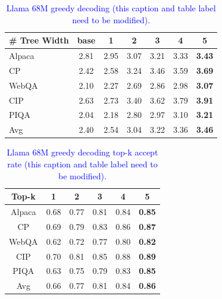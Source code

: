 \begin{table}
\begin{center}
\caption{\textcolor{blue}{Llama 68M greedy decoding (this caption and table label need to be modified).}}
\footnotesize
\label{tab:cbt-llama}
\begin{tabular}{l|cccccc}
\toprule
        \# Tree Width  &base   & 1 & 2 & 3 & 4 & 5 \\ \midrule
Alpaca     &2.81     & 2.95     & 3.07    & 3.21     & 3.33     & \textbf{3.43}     \\
CP         &2.42     & 2.58     & 3.24    & 3.46     & 3.59     & \textbf{3.69}     \\
WebQA      &2.10     & 2.27     & 2.69    & 2.86     & 2.98     & \textbf{3.07}     \\ 
CIP        &2.63     & 2.73     & 3.40    & 3.62     & 3.79     & \textbf{3.91}     \\
PIQA       &2.04     & 2.18     & 2.80    & 2.97     & 3.10     & \textbf{3.21}     \\   \midrule
Avg        &2.40     & 2.54     & 3.04    & 3.22     & 3.36     & \textbf{3.46}      \\ \bottomrule
\end{tabular}
\end{center}
\end{table}

\begin{table}
\begin{center}
\caption{\textcolor{blue}{Llama 68M greedy decoding top-k accept rate (this caption and table label need to be modified).}}
\footnotesize
\label{tab:cbt-llama}
\begin{tabular}{cccccc}
\toprule
           Top-k     & 1 & 2 & 3 & 4 & 5 \\ \midrule
Alpaca     &0.68          & 0.77    & 0.81     & 0.84     & \textbf{0.85}     \\
CP         &0.69          & 0.79    & 0.83     & 0.86     & \textbf{0.87}     \\
WebQA      &0.62          & 0.72    & 0.77     & 0.80     & \textbf{0.82}     \\ 
CIP        &0.70          & 0.81    & 0.85     & 0.88     & \textbf{0.89}     \\
PIQA       &0.63          & 0.75    & 0.79     & 0.83     & \textbf{0.85}     \\   \midrule
Avg        &0.66          & 0.77    & 0.81     & 0.84     & \textbf{0.86}      \\ \bottomrule
\end{tabular}
\end{center}
\end{table}

